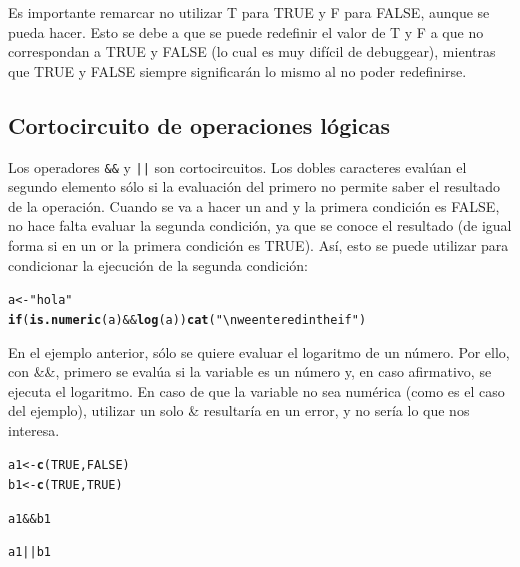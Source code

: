 \documentclass{config/apuntes}\usepackage[]{graphicx}\usepackage[]{xcolor}
\makeatletter
\newcommand{\hlnum}[1]{\textcolor[rgb]{0.686,0.059,0.569}{#1}}%
\newcommand{\hlsng}[1]{\textcolor[rgb]{0.192,0.494,0.8}{#1}}%
\newcommand{\hlopt}[1]{\textcolor[rgb]{0,0,0}{#1}}%
\newcommand{\hldef}[1]{\textcolor[rgb]{0.345,0.345,0.345}{#1}}%
\newcommand{\hlkwa}[1]{\textcolor[rgb]{0.161,0.373,0.58}{\textbf{#1}}}%
\newcommand{\hlkwb}[1]{\textcolor[rgb]{0.69,0.353,0.396}{#1}}%
\newcommand{\hlkwd}[1]{\textcolor[rgb]{0.737,0.353,0.396}{\textbf{#1}}}%
\newenvironment{kframe}{%
 \def\at@end@of@kframe{}%
 \ifinner\ifhmode%
  \def\at@end@of@kframe{\end{minipage}}%
  \begin{minipage}{\columnwidth}%
 \fi\fi%
 \def\FrameCommand##1{\hskip\@totalleftmargin \hskip-\fboxsep
 \colorbox{shadecolor}{##1}\hskip-\fboxsep
     \hskip-\linewidth \hskip-\@totalleftmargin \hskip\columnwidth}%
 \MakeFramed {\advance\hsize-\width
   \@totalleftmargin\z@ \linewidth\hsize
   \@setminipage}}%
 {\par\unskip\endMakeFramed%
 \at@end@of@kframe}
\newenvironment{knitrout}{}{} %
\newcommand{\code}[1]{\texttt{#1}}
\makeatother
\begin{document}
Es importante remarcar no utilizar T para TRUE y F para FALSE, aunque se pueda hacer. Esto se debe a que se puede redefinir el valor de T y F a que no correspondan a TRUE y FALSE (lo cual es muy difícil de debuggear), mientras que TRUE y FALSE siempre significarán lo mismo al no poder redefinirse. 

\subsection{Cortocircuito de operaciones lógicas}
Los operadores \code{\&\&} y \code{||} son cortocircuitos. Los dobles caracteres evalúan el segundo elemento sólo si la evaluación del primero no permite saber el resultado de la operación. Cuando se va a hacer un and y la primera condición es FALSE, no hace falta evaluar la segunda condición, ya que se conoce el resultado (de igual forma si en un or la primera condición es TRUE). Así, esto se puede utilizar para condicionar la ejecución de la segunda condición:

\begin{knitrout}
\color{fgcolor}\begin{kframe}
\begin{alltt}
\hldef{a} \hlkwb{<-} \hlsng{"hola"}
\hlkwa{if} \hldef{(}\hlkwd{is.numeric}\hldef{(a)} \hlopt{&&} \hlkwd{log}\hldef{(a))} \hlkwd{cat}\hldef{(}\hlsng{"\textbackslash{}n we entered in the if"}\hldef{)}
\end{alltt}
\end{kframe}
\end{knitrout}

En el ejemplo anterior, sólo se quiere evaluar el logaritmo de un número. Por ello, con \&\&, primero se evalúa si la variable es un número y, en caso afirmativo, se ejecuta el logaritmo. En caso de que la variable no sea numérica (como es el caso del ejemplo), utilizar un solo \& resultaría en un error, y no sería lo que nos interesa. 

\begin{knitrout}
\color{fgcolor}\begin{kframe}
\begin{alltt}
\hldef{a1} \hlkwb{<-} \hlkwd{c}\hldef{(}\hlnum{TRUE}\hldef{,} \hlnum{FALSE}\hldef{)}
\hldef{b1} \hlkwb{<-} \hlkwd{c}\hldef{(}\hlnum{TRUE}\hldef{,} \hlnum{TRUE}\hldef{)}

\hldef{a1} \hlopt{&&} \hldef{b1}
\end{alltt}


{\ttfamily\noindent\bfseries\color{errorcolor}{\#\# Error in a1 \&\& b1: 'length = 2' in coercion to 'logical(1)'}}\begin{alltt}
\hldef{a1} \hlopt{||} \hldef{b1}
\end{alltt}


{\ttfamily\noindent\bfseries\color{errorcolor}{\#\# Error in a1 || b1: 'length = 2' in coercion to 'logical(1)'}}\end{kframe}
\end{knitrout}
\end{document}
